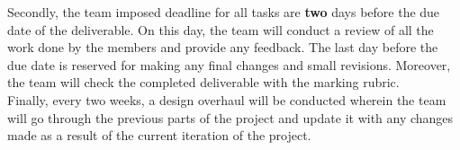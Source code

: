 \documentclass{article}
\begin{document}
Secondly, the team imposed deadline for all tasks are \textbf{two} days before the due date of the deliverable. On this day, the team will conduct a review of all the work done by the members and provide any feedback. The last day before the due date is reserved for making any final changes and small revisions. Moreover, the team will check the completed deliverable with the marking rubric.\\

Finally, every two weeks, a design overhaul will be conducted wherein the team will go through the previous parts of the project and update it with any changes made as a result of the current iteration of the project.\\
\end{document}
